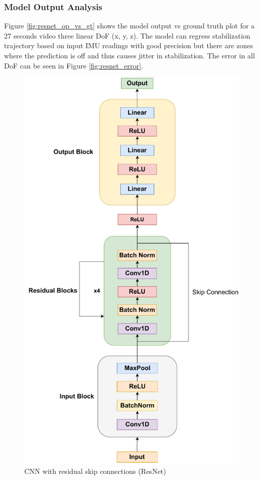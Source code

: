 \subsubsection{Model Output Analysis}
Figure \ref{fig:resnet_op_vs_gt} shows the model output vs ground truth plot for a 27 seconds video three linear DoF (x, y, z). The model can regress stabilization trajectory based on input IMU readings with good precision but there are zones where the prediction is off and thus causes jitter in stabilization. The error in all DoF can be seen in Figure \ref{fig:resnet_error}.

\begin{figure}[H]
    \centering
    \includegraphics[scale=0.55]{images/fig_chapter2/nns/resnet_mt.pdf}
    \caption{CNN with residual skip connections (ResNet)}
    \label{fig:resnet_used}
\end{figure}

